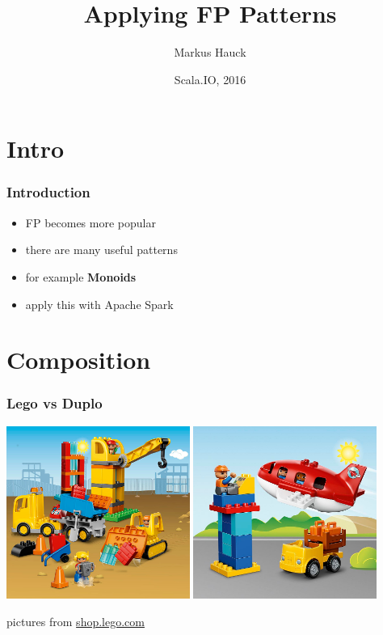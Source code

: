 \documentclass{beamer}
\title{Applying FP Patterns}
\author{Markus Hauck}
\date{Scala.IO, 2016}
\begin{document}
\frame{\titlepage}

\section{Intro}
\label{sec:intro}

\begin{frame}
  \frametitle{Introduction}
  \begin{itemize}
  \item FP becomes more popular
  \item there are many useful patterns
  \item for example \textbf{Monoids}
  \item apply this with Apache Spark
  \end{itemize}
\end{frame}

\section{Composition}

\begin{frame}
  \frametitle{Lego vs Duplo}
  \begin{center}
    \includegraphics[width=0.45\textwidth]{../images/duplo-construction.jpg}
    \hspace{1mm}
    \includegraphics[width=0.45\textwidth]{../images/duplo-airport.jpg}
  \end{center}
  \vfill
  \begin{center}
    {\tiny pictures from \url{shop.lego.com}}
  \end{center}
\end{frame}
\end{document}
